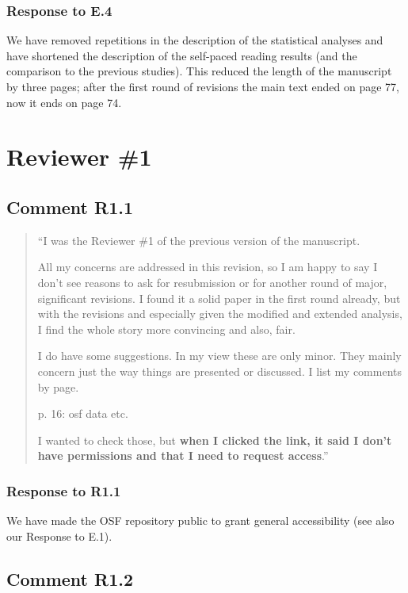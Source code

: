 \documentclass[12pt]{article}
\begin{document}
\subsubsection*{Response to E.4}
We have removed repetitions in the description of the statistical analyses and have shortened the description of the self-paced reading results (and the comparison to the previous studies). This reduced the length of the manuscript by three pages; after the first round of revisions the main text ended on page 77, now it ends on page 74. 

\section*{Reviewer \#1} 

\subsection*{Comment R1.1}
\begin{quote}
``I was the Reviewer \#1 of the previous version of the manuscript.

All my concerns are addressed in this revision, so I am happy to say I don't see reasons to ask for resubmission or for another round of major, significant revisions. I found it a solid paper in the first round already, but with the revisions and especially given the modified and extended analysis, I find the whole story more convincing and also, fair.

I do have some suggestions. In my view these are only minor. They mainly concern just the way things are presented or discussed. I list my comments by page.

p. 16: osf data etc.

I wanted to check those, but \textbf{when I clicked the link, it said I don't have permissions and that I need to request access}.''
\end{quote}

\subsubsection*{Response to R1.1}
We have made the OSF repository public to grant general accessibility (see also our Response to E.1).

\subsection*{Comment R1.2}
\end{document}
